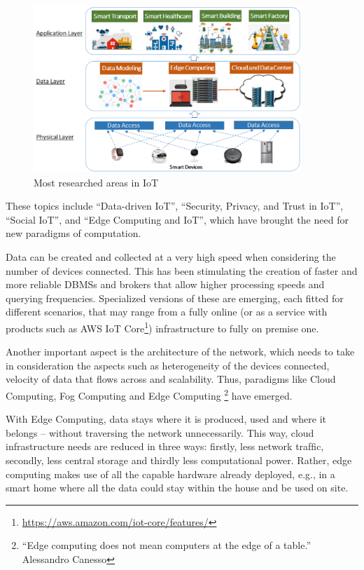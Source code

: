 			\begin{figure}[h]
				\centering
				\includegraphics[width=0.9\textwidth]{resources/img/chap2/iot_research_areas}
				\caption[Most researched areas in IoT]{Most researched areas in IoT \cite{9319033}}
				\label{iot_research_areas}
			\end{figure}
		
			These topics include ``Data-driven IoT'', ``Security, Privacy, and Trust in IoT'', ``Social IoT'', and ``Edge Computing and IoT'', which have brought the need for new paradigms of computation.
			
			Data can be created and collected at a very high speed when considering the number of devices connected.
			This has been stimulating the creation of faster and more reliable DBMSs and brokers that allow higher processing speeds and querying frequencies.
			Specialized versions of these are emerging, each fitted for different scenarios, that may range from a fully online (or as a service with products such as AWS IoT Core\footnote{\url{https://aws.amazon.com/iot-core/features/}}) infrastructure to fully on premise one.
			
			Another important aspect is the architecture of the network, which needs to take in consideration the aspects such as heterogeneity of the devices connected, velocity of data that flows across and scalability.
			Thus, paradigms like Cloud Computing, Fog Computing and Edge Computing \footnote{``Edge computing does not mean computers at the edge of a table.'' Alessandro Canesso} have emerged.
			
			With Edge Computing, data stays where it is produced, used and where it belongs – without traversing the network unnecessarily.
			This way, cloud infrastructure needs are reduced in three ways: ﬁrstly, less network trafﬁc, secondly, less central storage and thirdly less computational power. Rather, edge	computing makes use of all the capable hardware already
			deployed, e.g., in a smart home where all the data could
			stay within the house and be used on site.
			
